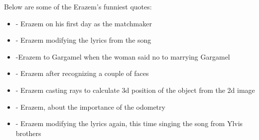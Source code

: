 \documentclass[12pt,a4paper]{article}
\begin{document}
	Below are some of the Erazem's funniest quotes: 
	\begin{itemize}
		\item {} - Erazem on his first day as the matchmaker
		\item {} - Erazem modifying the lyrics from the song
		\item {} -Erazem to Gargamel when the woman said no to marrying Gargamel
		\item {} - Erazem after recognizing a couple of faces
		\item {} - Erazem casting rays to calculate 3d position of the object from the 2d image
		\item {} - Erazem, about the importance of the odometry
		\item {} - Erazem modifying the lyrics again, this time singing the song from Ylvis brothers 
	\end{itemize}
	
\end{document}
